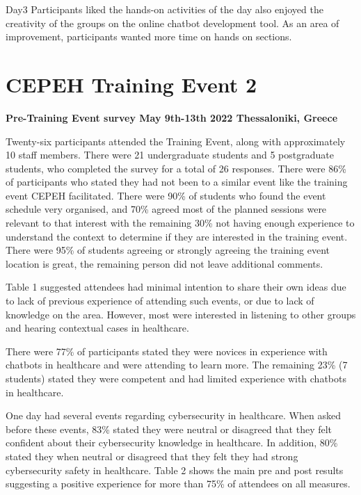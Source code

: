 \documentclass[a4paper, nobind]{templates/ociamthesis}
\begin{document}
Day3
Participants liked the hands-on activities of the day also enjoyed the creativity of the groups on the online chatbot development tool. As an area of improvement, participants wanted more time on hands on sections.

\hypertarget{cepeh-training-event-2}{%
\section{CEPEH Training Event 2}\label{cepeh-training-event-2}}

\textbf{Pre-Training Event survey May 9th-13th 2022 Thessaloniki, Greece}

Twenty-six participants attended the Training Event, along with approximately 10 staff members. There were 21 undergraduate students and 5 postgraduate students, who completed the survey for a total of 26 responses. There were 86\% of participants who stated they had not been to a similar event like the training event CEPEH facilitated. There were 90\% of students who found the event schedule very organised, and 70\% agreed most of the planned sessions were relevant to that interest with the remaining 30\% not having enough experience to understand the context to determine if they are interested in the training event. There were 95\% of students agreeing or strongly agreeing the training event location is great, the remaining person did not leave additional comments.

Table 1 suggested attendees had minimal intention to share their own ideas due to lack of previous experience of attending such events, or due to lack of knowledge on the area. However, most were interested in listening to other groups and hearing contextual cases in healthcare.

There were 77\% of participants stated they were novices in experience with chatbots in healthcare and were attending to learn more. The remaining 23\% (7 students) stated they were competent and had limited experience with chatbots in healthcare.

One day had several events regarding cybersecurity in healthcare. When asked before these events, 83\% stated they were neutral or disagreed that they felt confident about their cybersecurity knowledge in healthcare. In addition, 80\% stated they when neutral or disagreed that they felt they had strong cybersecurity safety in healthcare. Table 2 shows the main pre and post results suggesting a positive experience for more than 75\% of attendees on all measures.
\end{document}
